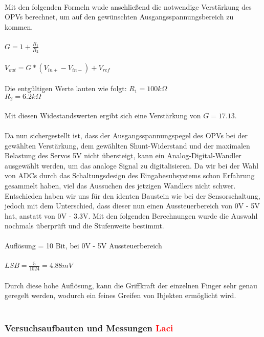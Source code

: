 \documentclass[titlepage,12pt,twoside]{article}
\begin{document}
\\
Mit den folgenden Formeln wude anschließend die notwendige Verstärkung des OPVs berechnet, um auf den gewünschten Ausgangsspannungsbereich zu kommen. \\
\\
$G = 1+\frac{R_{1}}{R_{2}}$ \\
\\
$V_{out} = G*(V_{in+}-V_{in-})+V_{ref}$ \\
\\
Die entgültigen Werte lauten wie folgt: $R_{1} = 100k\Omega$ \\
\hspace*{7.03cm}						$R_{2} = 6.2k\Omega$ \\
\\
Mit diesen Widestandswerten ergibt sich eine Verstärkung von $G = 17.13$. \\
\\
Da nun sichergestellt ist, dass der Ausgangsspannungspegel des OPVs bei der gewählten Verstärkung, dem gewählten Shunt-Widerstand und der 
maximalen Belastung des Servos 5V nicht übersteigt, kann ein Analog-Digital-Wandler ausgewählt werden, um das analoge Signal zu
digitalisieren. Da wir bei der Wahl von ADCs durch das Schaltungsdesign des Eingabesubsystems schon Erfahrung gesammelt haben, viel
das Aussuchen des jetzigen Wandlers nicht schwer. Entschieden haben wir uns für den identen Baustein wie bei der Sensorschaltung, 
jedoch mit dem Unterschied, dass dieser nun einen Aussteuerbereich von 0V - 5V hat, anstatt von 0V - 3.3V. Mit den folgenden Berechnungen
wurde die Auswahl nochmals überprüft und die Stufenweite bestimmt. \\
\\
Auflösung = 10 Bit, bei 0V - 5V Aussteuerbereich\\
\\
$LSB = \frac{5}{1024} = 4.88mV$ \\
\\
Durch diese hohe Auflösung, kann die Griffkraft der einzelnen Finger sehr genau geregelt werden, wodurch ein feines Greifen von Ibjekten
ermöglicht wird. \\
\\

\subsubsection{Versuchsaufbauten und Messungen \textcolor{red}{Laci}}
\end{document}
